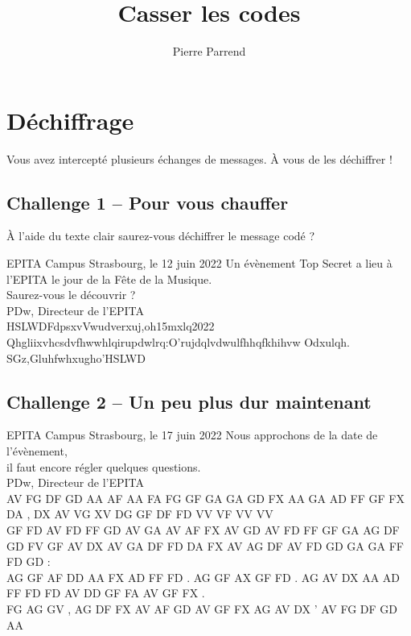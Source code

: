 \documentclass{article}
\begin{document}
	
	\title{\color{red}Casser les codes}
	\author{Pierre Parrend}
	\date{}
	\maketitle
	
	\section*{Déchiffrage}
	
	\begin{infobox}
		Vous avez intercepté plusieurs échanges de messages. À vous de les déchiffrer !
	\end{infobox}
	
	\subsection*{Challenge 1 – Pour vous chauffer}
	
	\begin{helpbox}
		À l’aide du texte clair saurez-vous déchiffrer le message codé ?
	\end{helpbox}
	
	\begin{messagebox}[blue]{{EPITA Campus Strasbourg, le 12 juin 2022}}
		Un évènement Top Secret a lieu à l'EPITA le jour de la Fête de la Musique.\\
		Saurez-vous le découvrir ?\\
		PDw, Directeur de l'EPITA\\
		HSLWDFdpsxvVwudverxuj,oh15mxlq2022\\
		Qhgliixvhcsdvfhwwhlqirupdwlrq:O'rujdqlvdwulfhhqfkhihvw Odxulqh.\\
		SGz,Gluhfwhxugho'HSLWD
	\end{messagebox}
	
	\subsection*{Challenge 2 – Un peu plus dur maintenant}
	
	\begin{messagebox}[blue]{{EPITA Campus Strasbourg, le 17 juin 2022}}
		Nous approchons de la date de l'évènement,\\
		il faut encore régler quelques questions.\\
		PDw, Directeur de l'EPITA\\
		AV FG DF GD AA AF AA FA FG GF GA GA GD FX AA GA AD FF GF FX DA , DX AV VG XV DG GF DF FD VV VF VV VV\\
		GF FD AV FD FF GD AV GA AV AF FX AV GD AV FD FF GF GA AG DF GD FV GF AV DX AV GA DF FD DA FX AV AG DF AV FD GD GA GA FF FD GD :\\
		AG GF AF DD AA FX AD FF FD . AG GF AX GF FD . AG AV DX AA AD FF FD FD AV DD GF FA AV GF FX .\\
		FG AG GV , AG DF FX AV AF GD AV GF FX AG AV DX ' AV FG DF GD AA
	\end{messagebox}
	
\end{document}
